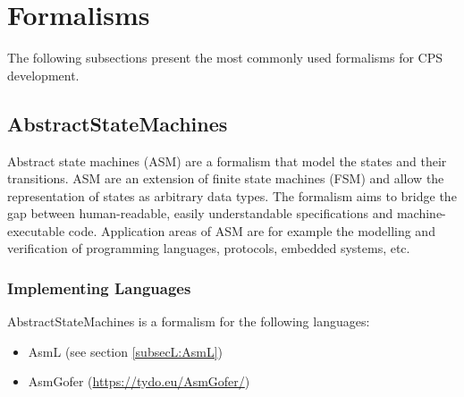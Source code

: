 \section{Formalisms}
\label{sec:formalisms}

The following subsections present the most commonly used formalisms for CPS development.

\subsection{AbstractStateMachines}
\label{subsecF:AbstractStateMachines}




Abstract state machines (ASM) are a formalism that model the states and their transitions.
ASM are an extension of finite state machines (FSM) and allow the representation of states as arbitrary data types. The formalism aims to bridge the gap between human-readable, easily understandable specifications and machine-executable code.
Application areas of ASM are for example the modelling and verification of programming languages, protocols, embedded systems, etc.




\subsubsection{Implementing Languages}

AbstractStateMachines is a formalism for the following languages:
\begin{itemize}
	\item AsmL (see section \ref{subsecL:AsmL})
	\item AsmGofer (\url{https://tydo.eu/AsmGofer/})
\end{itemize}


